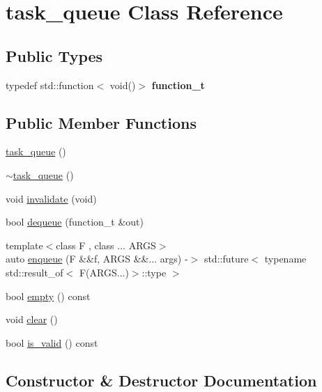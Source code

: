 \hypertarget{classtask__queue}{}\section{task\+\_\+queue Class Reference}
\label{classtask__queue}
\subsection*{Public Types}
\begin{DoxyCompactItemize}
\item 
\mbox{\label{classtask__queue_a54e486a36bec1abf4df464d82f8f7c69}} 
typedef std\+::function$<$ void()$>$ {\bfseries function\+\_\+t}
\end{DoxyCompactItemize}
\subsection*{Public Member Functions}
\begin{DoxyCompactItemize}
\item 
\hyperlink{classtask__queue_ae7cb46be591296794478488fbde3799b}{task\+\_\+queue} ()
\item 
\hyperlink{classtask__queue_a01f60d69b15bc36bced03f00b9f3d443}{$\sim$task\+\_\+queue} ()
\item 
void \hyperlink{classtask__queue_a3f49e001092757da141a3067744f6af0}{invalidate} (void)
\item 
bool \hyperlink{classtask__queue_a8febb9f611ff31bc105027c7d90784a6}{dequeue} (function\+\_\+t \&out)
\item 
{\footnotesize template$<$class F , class ... A\+R\+GS$>$ }\\auto \hyperlink{classtask__queue_ac9fce851e5f4eecd014ef0130f0db4bc}{enqueue} (F \&\&f, A\+R\+GS \&\&... args) -\/$>$ std\+::future$<$ typename std\+::result\+\_\+of$<$ F(A\+R\+G\+S...)$>$\+::type $>$
\item 
bool \hyperlink{classtask__queue_a124dd18ea98e42ae705f7835fd0c69cf}{empty} () const
\item 
void \hyperlink{classtask__queue_aded81b6de1995651057c306166c8ae8b}{clear} ()
\item 
bool \hyperlink{classtask__queue_a75e723aa9cc68a264d63b40b3ef3f280}{is\+\_\+valid} () const
\end{DoxyCompactItemize}


\subsection{Constructor \& Destructor Documentation}
\mbox{\label{classtask__queue_ae7cb46be591296794478488fbde3799b}} 
